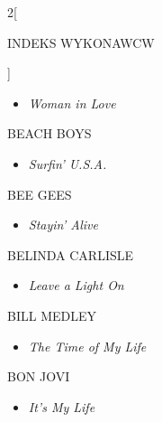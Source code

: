 \documentclass[a4paper]{report}
\begin{document}
\begin{multicols*}{2}[\begin{Huge}INDEKS WYKONAWCW\end{Huge}\vspace{1cm}]
\begin{minipage}{\columnwidth}
\begin{itemize}[topsep=3pt, after=\vspace{3mm}]
		\item[]  \textit{Woman in Love}  \\
	\end{itemize}
\end{minipage}
\begin{minipage}{\columnwidth}
	BEACH BOYS 
	\begin{itemize}[topsep=3pt, after=\vspace{3mm}]
		\itemsep0em
		\item[]\textit{Surfin' U.S.A.}  \\
	\end{itemize}
\end{minipage}
\begin{minipage}{\columnwidth}
	BEE GEES 
	\begin{itemize}[topsep=3pt, after=\vspace{3mm}]
		\itemsep0em
		\item[]\textit{Stayin' Alive}  \\
	\end{itemize}
\end{minipage}
\begin{minipage}{\columnwidth}
	BELINDA CARLISLE 
	\begin{itemize}[topsep=3pt, after=\vspace{3mm}]
		\itemsep0em
		\item[]\textit{Leave a Light On}  \\
	\end{itemize}
\end{minipage}
\begin{minipage}{\columnwidth}
	BILL MEDLEY 
	\begin{itemize}[topsep=3pt, after=\vspace{3mm}]
		\itemsep0em
		\item[]\textit{The Time of My Life}  \\
	\end{itemize}
\end{minipage}
\begin{minipage}{\columnwidth}
	BON JOVI 
	\begin{itemize}[topsep=3pt, after=\vspace{3mm}]
		\itemsep0em
		\item[]\textit{It's My Life}  \\
	\end{itemize}
\end{minipage}
\begin{minipage}{\columnwidth}

\end{minipage}
\end{multicols*}
\end{document}
